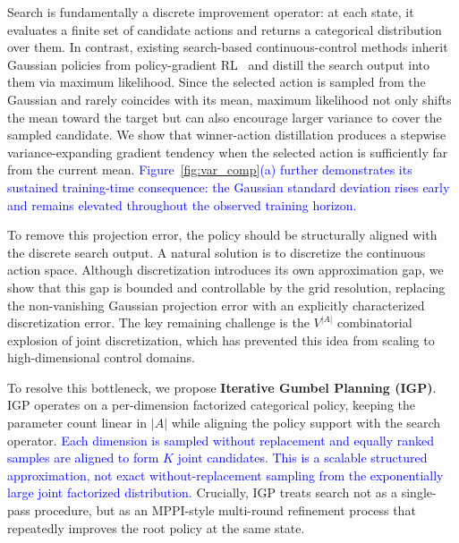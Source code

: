 Search is fundamentally a discrete improvement operator: at each state, it evaluates a finite set of candidate actions and returns a categorical distribution over them. In contrast, existing search-based continuous-control methods inherit Gaussian policies from policy-gradient RL~\citep{lillicrap2019continuouscontroldeepreinforcement, haarnoja2018soft} and distill the search output into them via maximum likelihood. Since the selected action is sampled from the Gaussian and rarely coincides with its mean, maximum likelihood not only shifts the mean toward the target but can also encourage larger variance to cover the sampled candidate. We show that winner-action distillation produces a stepwise variance-expanding gradient tendency when the selected action is sufficiently far from the current mean. \textcolor{blue}{Figure~\ref{fig:var_comp}(a) further demonstrates its sustained training-time consequence: the Gaussian standard deviation rises early and remains elevated throughout the observed training horizon.}

To remove this projection error, the policy should be structurally aligned with the discrete search output. A natural solution is to discretize the continuous action space. Although discretization introduces its own approximation gap, we show that this gap is bounded and controllable by the grid resolution, replacing the non-vanishing Gaussian projection error with an explicitly characterized discretization error. The key remaining challenge is the $V^{|A|}$ combinatorial explosion of joint discretization, which has prevented this idea from scaling to high-dimensional control domains.

To resolve this bottleneck, we propose \textbf{Iterative Gumbel Planning (IGP)}. IGP operates on a per-dimension factorized categorical policy, keeping the parameter count linear in $|A|$ while aligning the policy support with the search operator. \textcolor{blue}{Each dimension is sampled without replacement and equally ranked samples are aligned to form $K$ joint candidates. This is a scalable structured approximation, not exact without-replacement sampling from the exponentially large joint factorized distribution.} Crucially, IGP treats search not as a single-pass procedure, but as an MPPI-style multi-round refinement process that repeatedly improves the root policy at the same state.

